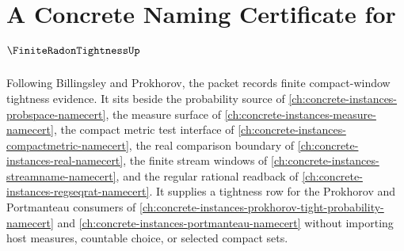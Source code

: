 \chapter{A Concrete Naming Certificate for $\FiniteRadonTightnessUp$}
\label{ch:concrete-instances-finite-radon-tightness-namecert}

Following Billingsley and Prokhorov, the packet records finite compact-window tightness evidence. It sits beside the probability source of \autoref{ch:concrete-instances-probspace-namecert}, the measure surface of \autoref{ch:concrete-instances-measure-namecert}, the compact metric test interface of \autoref{ch:concrete-instances-compactmetric-namecert}, the real comparison boundary of \autoref{ch:concrete-instances-real-namecert}, the finite stream windows of \autoref{ch:concrete-instances-streamname-namecert}, and the regular rational readback of \autoref{ch:concrete-instances-regseqrat-namecert}. It supplies a tightness row for the Prokhorov and Portmanteau consumers of \autoref{ch:concrete-instances-prokhorov-tight-probability-namecert} and \autoref{ch:concrete-instances-portmanteau-namecert} without importing host measures, countable choice, or selected compact sets.

